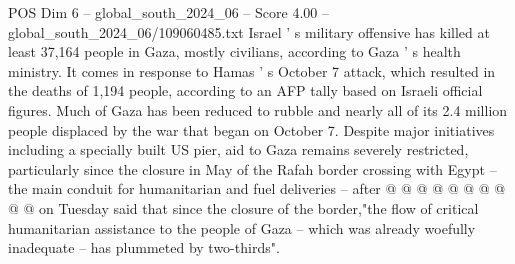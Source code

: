 \begin{textsample}{POS Dim 6 – global\_south\_2024\_06 – Score 4.00 – global\_south\_2024\_06/109060485.txt}
Israel ' s military offensive has killed at least 37,164 people in Gaza, mostly civilians, according to Gaza ' s health ministry.
It comes in response to Hamas ' s October 7 attack, which resulted in the deaths of 1,194 people, according to an AFP tally based on Israeli official figures.
Much of Gaza has been reduced to rubble and nearly all of its 2.4 million people displaced by the war that began on October 7.
Despite major initiatives including a specially built US pier, aid to Gaza remains severely restricted, particularly since the closure in May of the Rafah border crossing with Egypt -- the main conduit for humanitarian and fuel deliveries -- after @ @ @ @ @ @ @ @ @ @ on Tuesday said that since the closure of the border,"the flow of critical humanitarian assistance to the people of Gaza -- which was already woefully inadequate -- has plummeted by two-thirds".

\end{textsample}

